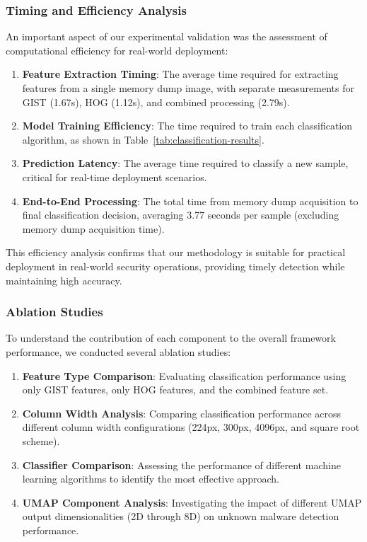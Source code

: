 \subsubsection{Timing and Efficiency Analysis}

An important aspect of our experimental validation was the assessment of computational efficiency for real-world deployment:

\begin{enumerate}
    \item \textbf{Feature Extraction Timing}: The average time required for extracting features from a single memory dump image, with separate measurements for GIST (1.67s), HOG (1.12s), and combined processing (2.79s).
    
    \item \textbf{Model Training Efficiency}: The time required to train each classification algorithm, as shown in Table~\ref{tab:classification-results}.
    
    \item \textbf{Prediction Latency}: The average time required to classify a new sample, critical for real-time deployment scenarios.
    
    \item \textbf{End-to-End Processing}: The total time from memory dump acquisition to final classification decision, averaging 3.77 seconds per sample (excluding memory dump acquisition time).
\end{enumerate}

This efficiency analysis confirms that our methodology is suitable for practical deployment in real-world security operations, providing timely detection while maintaining high accuracy.

\subsubsection{Ablation Studies}

To understand the contribution of each component to the overall framework performance, we conducted several ablation studies:

\begin{enumerate}
    \item \textbf{Feature Type Comparison}: Evaluating classification performance using only GIST features, only HOG features, and the combined feature set.
    
    \item \textbf{Column Width Analysis}: Comparing classification performance across different column width configurations (224px, 300px, 4096px, and square root scheme).
    
    \item \textbf{Classifier Comparison}: Assessing the performance of different machine learning algorithms to identify the most effective approach.
    
    \item \textbf{UMAP Component Analysis}: Investigating the impact of different UMAP output dimensionalities (2D through 8D) on unknown malware detection performance.
\end{enumerate}

